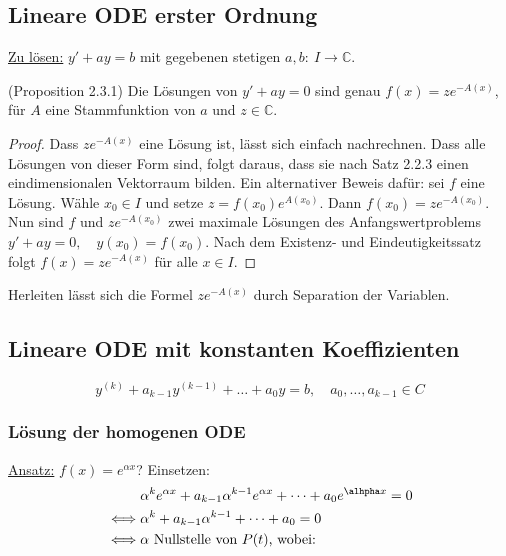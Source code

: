 \documentclass[a4paper,10pt]{article}
\def\C{\mathbb{C}}
\begin{document}
\subsection{Lineare ODE erster Ordnung}

\underline{Zu lösen:} \( y' + ay = b \) mit gegebenen stetigen \( a, b: \: I \to \C \).

\begin{subbox}{(Proposition 2.3.1)}
    Die Lösungen von \( y' + ay = 0 \) sind genau \( f(x) = z e^{-A(x)} \), für \( A \) eine Stammfunktion von \( a \) und \( z \in \C \).
\end{subbox}

\begin{proof}
    Dass \( z e^{-A(x)} \) eine Lösung ist, lässt sich einfach nachrechnen. Dass alle Lösungen von dieser Form sind, folgt daraus, dass sie nach Satz 2.2.3 einen eindimensionalen Vektorraum bilden.
    Ein alternativer Beweis dafür: sei \( f \) eine Lösung. Wähle \( x_0 \in I \) und setze \( z = f(x_0) e^{A(x_0)} \). Dann \( f(x_0) = z e^{-A(x_0)} \). Nun sind \( f \) und \( z e^{-A(x_0)} \) zwei maximale Lösungen des Anfangswertproblems \( y' + ay = 0, \quad y(x_0) = f(x_0) \). Nach dem Existenz- und Eindeutigkeitssatz folgt \( f(x) = z e^{-A(x)} \) für alle \( x \in I \).
\end{proof}

Herleiten lässt sich die Formel \( z e^{-A(x)} \) durch Separation der Variablen.

\subsection{Lineare ODE mit konstanten Koeffizienten}

\begin{equation} \label{script_eq_4}
    y^{(k)} + a_{k - 1} y^{(k - 1)} + \dots + a_0 y = b, \quad a_0, \dots, a_{k - 1} \in C
\end{equation}

\subsubsection{Lösung der homogenen ODE}
\underline{Ansatz:} \( f(x) = e^{\alpha x} \)? Einsetzen:
\begin{align*}
    & \alpha^k e^{\alpha x} + a_{k - 1} \alpha^{k - 1} e^{\alpha x} + \dots + a_0 e^{\alhpha x} = 0 \\
    \iff & \alpha^k + a_{k - 1} \alpha^{k - 1} + \dots + a_0 = 0 \\
    \iff & \alpha \text{ Nullstelle von \( P(t) \), wobei:}
\end{align*}
\end{document}

